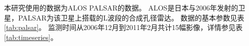 本研究使用的数据为ALOS PALSAR的数据。
ALOS是日本与2006年发射的卫星，PALSAR为该卫星上搭载的L波段的合成孔径雷达。
数据的基本参数见表\ref{tab:palsar}。
监测时间从2006年12月到2011年2月共计15幅影像，详情参见表\ref{tab:timeseries}。
